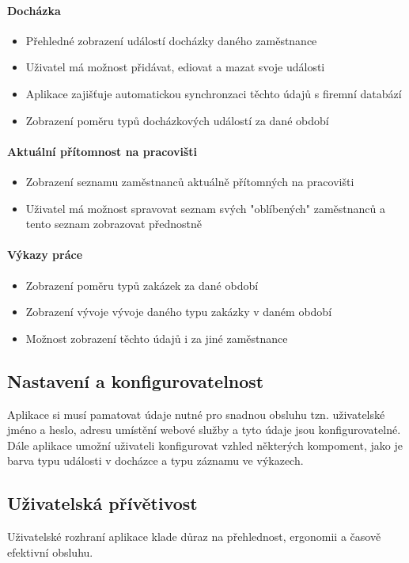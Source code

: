 \documentclass{bakalarka}
\begin{document}
\paragraph{Docházka}
\begin{itemize}
\item Přehledné zobrazení událostí docházky daného zaměstnance
\item Uživatel má možnost přidávat, ediovat a mazat svoje události
\item Aplikace zajišťuje automatickou synchronzaci těchto údajů s firemní databází
\item Zobrazení poměru typů docházkových událostí za dané období
\end{itemize}
\paragraph{Aktuální přítomnost na pracovišti}
\begin{itemize}
\item Zobrazení seznamu zaměstnanců aktuálně přítomných na pracovišti
\item Uživatel má možnost spravovat seznam svých "oblíbených" zaměstnanců a tento seznam zobrazovat přednostně
\end{itemize}
\paragraph{Výkazy práce}
\begin{itemize}
\item Zobrazení poměru typů zakázek za dané období
\item Zobrazení vývoje vývoje daného typu zakázky v daném období 
\item Možnost zobrazení těchto údajů i za jiné zaměstnance
\end{itemize}

\subsection{Nastavení a konfigurovatelnost}
Aplikace si musí pamatovat údaje nutné pro snadnou obsluhu tzn. uživatelské jméno a heslo, adresu umístění webové služby a tyto údaje jsou konfigurovatelné.\\
Dále aplikace umožní uživateli konfigurovat vzhled některých kompoment, jako je barva typu události v docházce a typu záznamu ve výkazech.

\subsection{Uživatelská přívětivost}
Uživatelské rozhraní aplikace klade důraz na přehlednost, ergonomii a časově efektivní obsluhu.
\end{document}
